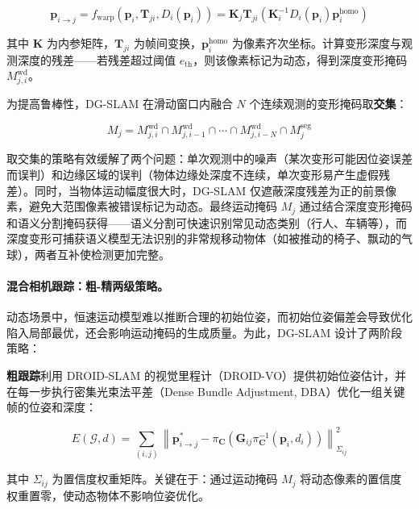 \begin{equation}
    \mathbf{p}_{i \to j} = f_{\mathrm{warp}}(\mathbf{p}_i, \mathbf{T}_{ji}, D_i(\mathbf{p}_i)) = \mathbf{K}_j \mathbf{T}_{ji} \left(\mathbf{K}_i^{-1} D_i(\mathbf{p}_i) \mathbf{p}_i^{\mathrm{homo}}\right)
\end{equation}

其中 $\mathbf{K}$ 为内参矩阵，$\mathbf{T}_{ji}$ 为帧间变换，$\mathbf{p}_i^{\mathrm{homo}}$ 为像素齐次坐标。计算变形深度与观测深度的残差——若残差超过阈值 $e_{\mathrm{th}}$，则该像素标记为动态，得到深度变形掩码 $M_{j,i}^{\mathrm{wd}}$。

为提高鲁棒性，DG-SLAM 在滑动窗口内融合 $N$ 个连续观测的变形掩码取\textbf{交集}：

\begin{equation}
    M_j = M_{j,i}^{\mathrm{wd}} \cap M_{j,i-1}^{\mathrm{wd}} \cap \cdots \cap M_{j,i-N}^{\mathrm{wd}} \cap M_j^{\mathrm{seg}}
\end{equation}

取交集的策略有效缓解了两个问题：单次观测中的噪声（某次变形可能因位姿误差而误判）和边缘区域的误判（物体边缘处深度不连续，单次变形易产生虚假残差）。同时，当物体运动幅度很大时，DG-SLAM 仅遮蔽深度残差为正的前景像素，避免大范围像素被错误标记为动态。最终运动掩码 $M_j$ 通过结合深度变形掩码和语义分割掩码获得——语义分割可快速识别常见动态类别（行人、车辆等），而深度变形可捕获语义模型无法识别的非常规移动物体（如被推动的椅子、飘动的气球），两者互补使检测更加完整。

\paragraph{混合相机跟踪：粗-精两级策略。}
动态场景中，恒速运动模型难以推断合理的初始位姿，而初始位姿偏差会导致优化陷入局部最优，还会影响运动掩码的生成质量。为此，DG-SLAM 设计了两阶段策略：

\textbf{粗跟踪}利用 DROID-SLAM 的视觉里程计（DROID-VO）提供初始位姿估计，并在每一步执行密集光束法平差（Dense Bundle Adjustment, DBA）优化一组关键帧的位姿和深度：

\begin{equation}
    E(\mathcal{G}, d) = \sum_{(i,j)} \left\| \mathbf{p}_{i \to j}^* - \pi_{\mathbf{C}} \left(\mathbf{G}_{ij} \pi_{\mathbf{C}}^{-1}(\mathbf{p}_i, d_i) \right) \right\|_{\Sigma_{ij}}^2
\end{equation}

其中 $\Sigma_{ij}$ 为置信度权重矩阵。关键在于：通过运动掩码 $M_j$ 将动态像素的置信度权重置零，使动态物体不影响位姿优化。

